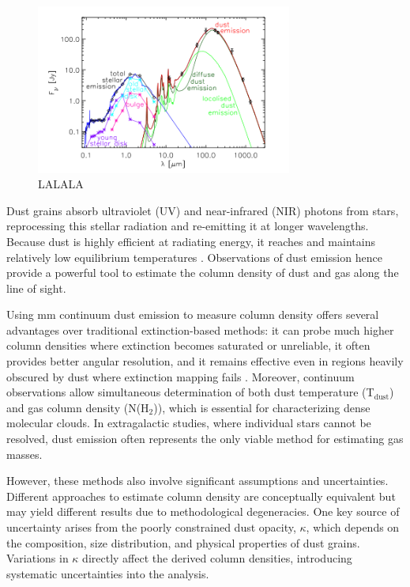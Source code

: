\begin{figure}
    \centering
    \includegraphics[width=0.75\textwidth]{figures/dust_emission_blackbody.png}
    \caption{LALALA \cite{popescu2011modelling}}
    \label{fig:dust_emission_blackbody}
\end{figure}

Dust grains absorb ultraviolet (UV) and near-infrared (NIR) photons from stars, reprocessing this stellar radiation and re-emitting it at longer wavelengths. 
Because dust is highly efficient at radiating energy, it reaches and maintains relatively low equilibrium temperatures \cite{hildebrand1983determination}. 
Observations of dust emission hence provide a powerful tool to estimate the column density of dust and gas along the line of sight.

Using mm continuum dust emission to measure column density offers several advantages over traditional extinction-based methods: it can probe much higher column densities where extinction becomes saturated or unreliable, it often provides better angular resolution, and it remains effective even in regions heavily obscured by dust where extinction mapping fails \cite{draine2003interstellar}. Moreover, continuum observations allow simultaneous determination of both dust temperature (T$_{\mathrm{dust}}$) and gas column density (N(H$_2$)), which is essential for characterizing dense molecular clouds. In extragalactic studies, where individual stars cannot be resolved, dust emission often represents the only viable method for estimating gas masses.

However, these methods also involve significant assumptions and uncertainties. Different approaches to estimate column density are conceptually equivalent but may yield different results due to methodological degeneracies. One key source of uncertainty arises from the poorly constrained dust opacity, $\kappa$, which depends on the composition, size distribution, and physical properties of dust grains. Variations in $\kappa$ directly affect the derived column densities, introducing systematic uncertainties into the analysis.

